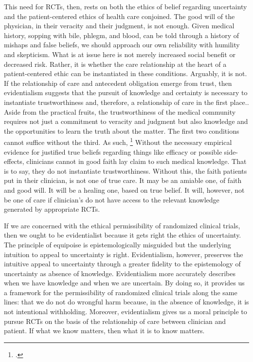 \documentclass[letterpaper,notitlepage,12pt]{article}
\begin{document}
This need for RCTs, then, rests on both the ethics of belief regarding
uncertainty and the patient-centered ethics of health care conjoined.
The good will of the physician, in their veracity and their judgment, is not
enough.
Given medical history, sopping with bile, phlegm, and blood, can be told through
a history of mishaps and false beliefs, we should approach our own reliability
with humility and skepticism.
What is at issue here is not merely increased social benefit or decreased risk.
Rather, it is whether the care relationship at the heart of a patient-centered
ethic can be instantiated in these conditions.
Arguably, it is not.
If the relationship of care and antecedent obligation emerge from trust, then
evidentialism suggests that the pursuit of knowledge and certainty is necessary
to instantiate trustworthiness and, therefore, a relationship of care in the
first place..
Aside from the practical fruits, the trustworthiness of the medical community
requires not just a commitment to veracity and judgment but also knowledge and
the opportunities to learn the truth about the matter.
The first two conditions cannot suffice without the third.
As such, \footcite[p. 354]{clifford_ethics_1886}
Without the necessary empirical evidence for justified true beliefs regarding
things like efficacy or possible side-effects, clinicians cannot in good faith
lay claim to such medical knowledge.
That is to say, they do not instantiate trustworthiness.
Without this, the faith patients put in their clinician, is not one of true
care.
It may be an amiable one, of faith and good will.
It will be a healing one, based on true belief.
It will, however, not be one of care if clinician's do not have access to the
relevant knowledge generated by appropriate RCTs.

If we are concerned with the ethical permissibility of randomized clinical
trials, then we ought to be evidentialist because it gets right the ethics of
uncertainty.
The principle of equipoise is epistemologically misguided but the underlying
intuition to appeal to uncertainty is right.
Evidentialism, however, preserves the intuitive appeal to uncertainty through a
greater fidelity to the epistemology of uncertainty as absence of knowledge.
Evidentialism more accurately describes when we have knowledge and when we are
uncertain.
By doing so, it provides us a framework for the permissibility of randomized
clinical trials along the same lines: that we do not do wrongful harm because,
in the absence of knowledge, it is not intentional withholding.
Moreover, evidentialism gives us a moral principle to pursue RCTs on the basis
of the relationship of care between clinician and patient.
If what we know matters, then what it is to know matters.

\printbibliography
\end{document}
